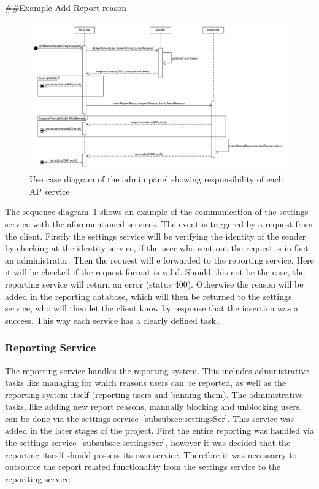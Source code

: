##Example Add Report reason
\begin{figure}[!ht]
    \centering
    \includegraphics[width=1.0\textwidth]{./images/SequenceDiagram_AddReportReason.pdf}
    \caption{Use case diagram of the admin panel showing responsibility of each AP service}
    \label{fig:addReportReason}
\end{figure}
The sequence diagram~\ref{fig:addReportReason} shows an example of the communication of the settings service with the aforementioned services.
The event is triggered by a request from the client.
Firstly the settings service will be verifying the identity of the sender by checking at the identity service, if the user who sent out the request is in fact an administrator.
Then the request will e forwarded to the reporting service. Here it will be checked if the request format is valid. Should this not be the case, the reporting service will return an error (status 400).
Otherwise the reason will be added in the reporting database, which will then be returned to the settings service, who will then let the client know by response that the insertion was a success.
This way each service has a clearly defined task.

\subsubsection{Reporting Service}
\label{subsubsec:reportingSer}
The reporting service handles the reporting system.
This includes administrative tasks like managing for which reasons users can be reported, as well as the reporting system itself (reporting users and banning them).
The administrative tasks, like adding new report reasons, manually blocking and unblocking users, can be done via the
settings service~\ref{subsubsec:settingsSer}.
This service was added in the later stages of the project.
First the entire reporting was handled via the settings service~\ref{subsubsec:settingsSer}, however it was decided that the reporting itseslf should possess its own service.
Therefore it was necessarry to outsource the report related functionality from the settings service to the reporiting service


